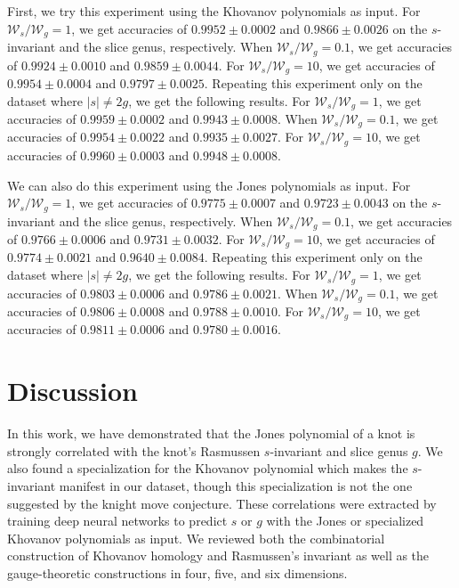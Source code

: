 \documentclass[11pt]{article}
\numberwithin{equation}{section}
\begin{document}
First, we try this experiment using the Khovanov polynomials as input. For $\mathcal{W}_s/\mathcal{W}_g = 1$, we get accuracies of $0.9952 \pm 0.0002$ and $0.9866 \pm 0.0026$ on the $s$-invariant and the slice genus, respectively. When $\mathcal{W}_s/\mathcal{W}_g = 0.1$, we get accuracies of $0.9924 \pm 0.0010$ and $0.9859 \pm 0.0044$. For $\mathcal{W}_s/\mathcal{W}_g=10$, we get accuracies of $0.9954\pm 0.0004$ and $0.9797 \pm 0.0025$. Repeating this experiment only on the dataset where $|s| \neq 2g$, we get the following results.  For $\mathcal{W}_s/\mathcal{W}_g = 1$, we get accuracies of $0.9959 \pm 0.0002$ and $0.9943 \pm 0.0008$. When $\mathcal{W}_s/\mathcal{W}_g = 0.1$, we get accuracies of $0.9954 \pm 0.0022$ and $0.9935 \pm 0.0027$. For $\mathcal{W}_s/\mathcal{W}_g=10$, we get accuracies of $0.9960\pm 0.0003$ and $0.9948 \pm 0.0008$.

We can also do this experiment using the Jones polynomials as input. For $\mathcal{W}_s/\mathcal{W}_g = 1$, we get accuracies of $0.9775 \pm 0.0007$ and $0.9723 \pm 0.0043$ on the $s$-invariant and the slice genus, respectively. When $\mathcal{W}_s/\mathcal{W}_g = 0.1$, we get accuracies of $0.9766 \pm 0.0006$ and $0.9731 \pm 0.0032$. For $\mathcal{W}_s/\mathcal{W}_g=10$, we get accuracies of $0.9774\pm 0.0021$ and $0.9640\pm 0.0084$. Repeating this experiment only on the dataset where $|s| \neq 2g$, we get the following results. For $\mathcal{W}_s/\mathcal{W}_g = 1$, we get accuracies of $0.9803 \pm 0.0006$ and $0.9786 \pm 0.0021$. When $\mathcal{W}_s/\mathcal{W}_g = 0.1$, we get accuracies of $0.9806 \pm 0.0008$ and $0.9788 \pm 0.0010$. For $\mathcal{W}_s/\mathcal{W}_g=10$, we get accuracies of $0.9811\pm 0.0006$ and $0.9780 \pm 0.0016$.

 
\section{Discussion}\label{sec:disc}
In this work, we have demonstrated that the Jones polynomial of a knot is strongly correlated with the knot's Rasmussen $s$-invariant and slice genus $g$.
We also found a specialization for the Khovanov polynomial which makes the $s$-invariant manifest in our dataset, though this specialization is not the one suggested by the knight move conjecture.
These correlations were extracted by training deep neural networks to predict $s$ or $g$ with the Jones or specialized Khovanov polynomials as input.
We reviewed both the combinatorial construction of Khovanov homology and Rasmussen's invariant as well as the gauge-theoretic constructions in four, five, and six dimensions.
\end{document}
